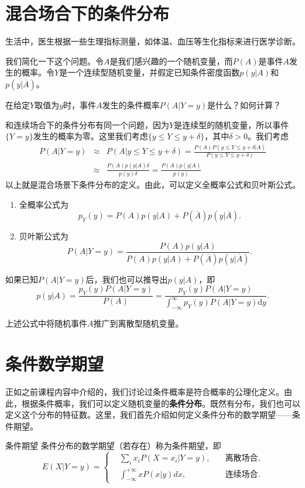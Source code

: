 \section{混合场合下的条件分布}
\begin{example}
    生活中，医生根据一些生理指标测量，如体温、血压等生化指标来进行医学诊断。
\end{example}

我们简化一下这个问题。令$A$是我们感兴趣的一个随机变量，而$P(A)$是事件$A$发生的概率。令$Y$是一个连续型随机变量，并假定已知条件密度函数$p(y|A)$和$p(y|\overline{A})$。

\begin{problem}
    在给定$Y$取值为$y$时，事件$A$发生的条件概率$P(A|Y=y)$是什么？如何计算？
\end{problem}

和连续场合下的条件分布有同一个问题，因为$Y$是连续型的随机变量，所以事件$\{Y = y\}$发生的概率为零。这里我们考虑$\{y \leq Y \leq y + \delta\}$，其中$\delta>0$。我们考虑
\begin{eqnarray*}
    P(A | Y= y) &\approx& P(A|y \leq Y \leq y+\delta)= \frac{P(A)P(y\leq Y\leq y+\delta | A)}{P(y \leq Y\leq y+\delta)}\\
    &\approx& \frac{P(A) p(y|A)\delta}{p(y)\delta} = \frac{P(A) p(y|A)}{p(y)}
\end{eqnarray*}
以上就是混合场景下条件分布的定义。由此，可以定义全概率公式和贝叶斯公式。
\begin{enumerate}
    \item 全概率公式为
    $$
    p_Y(y) = P(A) p(y|A) + P(\overline{A}) p(y|\overline{A}). 
    $$
    \item 贝叶斯公式为
    $$
    P(A|Y= y) = \frac{P(A)p(y|A)}{P(A)p(y|A) + P(\overline{A})p(y|\overline{A})}.
    $$
\end{enumerate}

如果已知$P(A|Y=y)$后，我们也可以推导出$p(y|A)$，即
$$
p(y|A) = \frac{p_Y(y) P(A|Y=y)}{P(A)} = \frac{p_Y(y) P(A|Y=y)}{\int_{-\infty}^{\infty} p_Y(y) P(A|Y=y) \text{d} y}.
$$

\begin{remark}
    上述公式中将随机事件$A$推广到离散型随机变量。
\end{remark}

\section{条件数学期望}
正如之前课程内容中介绍的，我们讨论过条件概率是符合概率的公理化定义。由此，根据条件概率，我们可以定义随机变量的\textbf{条件分布}。既然有分布，我们也可以定义这个分布的特征数。这里，我们首先介绍如何定义条件分布的数学期望——条件期望。
\begin{definition}{条件期望}\label{def:conditional_expectation}
条件分布的数学期望（若存在）称为条件期望，即$$E(X | Y=y)=\left\{\begin{aligned}
    &\sum_{i} x_{i} P\left(X=x_{i}  |  Y=y\right) , &\quad \text{离散场合},\\
  &\int_{-\infty}^{+\infty} x P(x  |  y) d x,&\quad \text{连续场合}.
\end{aligned}
\right.$$
\end{definition}

